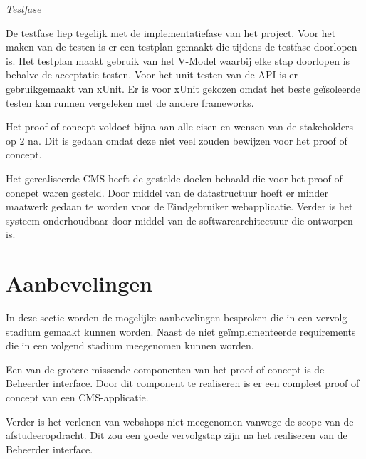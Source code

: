 \begin{center}
\textit{Testfase}
\end{center}

\whitespace
De testfase liep tegelijk met de implementatiefase van het project.
Voor het maken van de testen is er een testplan gemaakt die tijdens de testfase doorlopen is.
Het testplan maakt gebruik van het V-Model waarbij elke stap doorlopen is behalve de acceptatie testen.
Voor het unit testen van de API is er gebruikgemaakt van xUnit.
Er is voor xUnit gekozen omdat het beste geïsoleerde testen kan runnen vergeleken met de andere frameworks.

\whitespace
Het proof of concept voldoet bijna aan alle eisen en wensen van de stakeholders op 2 na.
Dit is gedaan omdat deze niet veel zouden bewijzen voor het proof of concept.

\whitespace
Het gerealiseerde CMS heeft de gestelde doelen behaald die voor het proof of concpet waren gesteld.
Door middel van de datastructuur hoeft er minder maatwerk gedaan te worden voor de \gls{Eindgebruiker} webapplicatie. 
Verder is het systeem onderhoudbaar door middel van de softwarearchitectuur die ontworpen is.

\section{Aanbevelingen}
In deze sectie worden de mogelijke aanbevelingen besproken die in een vervolg stadium gemaakt kunnen worden.
Naast de niet geïmplementeerde requirements die in een volgend stadium meegenomen kunnen worden.

\whitespace
Een van de grotere missende componenten van het proof of concept is de \gls{Beheerder} interface.
Door dit component te realiseren is er een compleet proof of concept van een \gls{CMS}-applicatie.

\whitespace
Verder is het verlenen van webshops niet meegenomen vanwege de scope van de afstudeeropdracht.
Dit zou een goede vervolgstap zijn na het realiseren van de \gls{Beheerder} interface.
